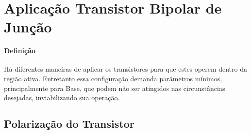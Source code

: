 \documentclass{article}
\begin{document}
    \section{Aplicação Transistor Bipolar de Junção}
        \paragraph{Definição}Há diferentes maneiras de aplicar os transistores para que estes operem dentro da região ativa. Entretanto essa configuração demanda parâmetros mínimos, principalmente para Base, que podem não ser atingidos nas circunstâncias desejadas, inviabilizando sua operação. 

        \subsection{Polarização do Transistor}
\end{document}
